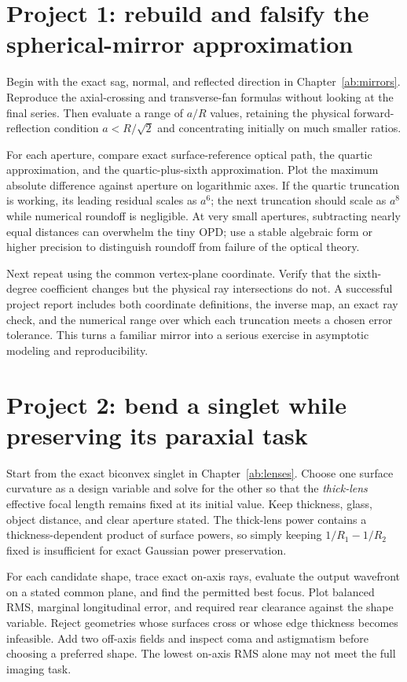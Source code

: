 \section{Project 1: rebuild and falsify the spherical-mirror approximation}
Begin with the exact sag, normal, and reflected direction in
Chapter~\ref{ab:mirrors}. Reproduce the axial-crossing and transverse-fan
formulas without looking at the final series. Then evaluate a range of
$a/R$ values, retaining the physical forward-reflection condition
$a<R/\sqrt2$ and concentrating initially on much smaller ratios.

For each aperture, compare exact surface-reference optical path, the
quartic approximation, and the quartic-plus-sixth approximation. Plot the
maximum absolute difference against aperture on logarithmic axes. If the
quartic truncation is working, its leading residual scales as $a^6$; the
next truncation should scale as $a^8$ while numerical roundoff is negligible.
At very small apertures, subtracting nearly equal distances can overwhelm
the tiny OPD; use a stable algebraic form or higher precision to distinguish
roundoff from failure of the optical theory.

Next repeat using the common vertex-plane coordinate. Verify that the
sixth-degree coefficient changes but the physical ray intersections do not.
A successful project report includes both coordinate definitions, the
inverse map, an exact ray check, and the numerical range over which each
truncation meets a chosen error tolerance. This turns a familiar mirror into
a serious exercise in asymptotic modeling and reproducibility.

\section{Project 2: bend a singlet while preserving its paraxial task}
Start from the exact biconvex singlet in Chapter~\ref{ab:lenses}. Choose one
surface curvature as a design variable and solve for the other so that the
\emph{thick-lens} effective focal length remains fixed at its initial value.
Keep thickness, glass, object distance, and clear aperture stated. The
thick-lens power contains a thickness-dependent product of surface powers,
so simply keeping $1/R_1-1/R_2$ fixed is insufficient for exact Gaussian
power preservation.

For each candidate shape, trace exact on-axis rays, evaluate the output
wavefront on a stated common plane, and find the permitted best focus. Plot
balanced RMS, marginal longitudinal error, and required rear clearance
against the shape variable. Reject geometries whose surfaces cross or whose
edge thickness becomes infeasible. Add two off-axis fields and inspect coma
and astigmatism before choosing a preferred shape. The lowest on-axis RMS
alone may not meet the full imaging task.

